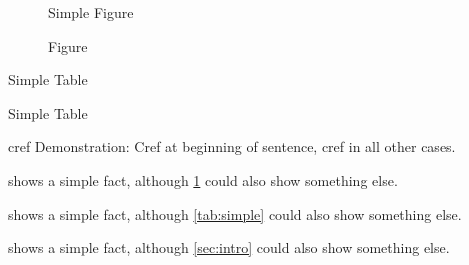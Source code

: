 \documentclass[runningheads,a4paper]{llncs}
\begin{document}





\begin{figure}
	Simple Figure
	\caption{ Figure}
	\label{fig:simple}
\end{figure}

\begin{table}
	\caption{Simple Table}
	
	\label{tab:simple}
	Simple Table
\end{table}
cref Demonstration: Cref at beginning of sentence, cref in all other cases.

 shows a simple fact, although \cref{fig:simple} could also show something else.

 shows a simple fact, although \cref{tab:simple} could also show something else.

 shows a simple fact, although \cref{sec:intro} could also show something else.
\end{document}

